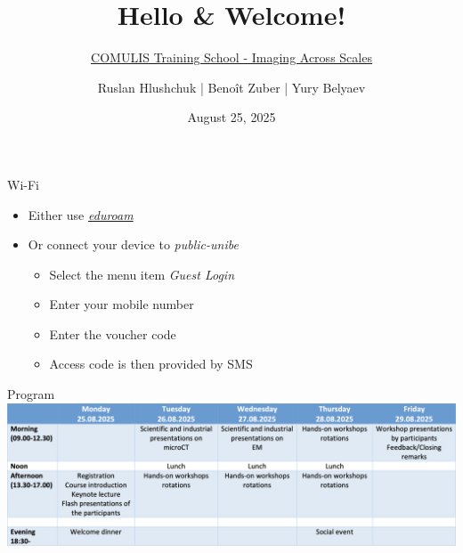 \documentclass[aspectratio=169,12pt]{beamer}
\title{Hello \& Welcome!}
\subtitle{\href{https://www.ana.unibe.ch/weiterbildung/comulis_training_school/}{COMULIS Training School - Imaging Across Scales}}
\author{Ruslan Hlushchuk | Benoît Zuber | Yury Belyaev}
\institute{Institute of Anatomy}
\date{August 25, 2025}
\begin{document}
\begin{frame}
	\titlepage
\end{frame}

\begin{frame}{Wi-Fi}
	\begin{itemize}
		\item Either use \emph{\href{https://www.eduroam.org/}{eduroam}}
		\item Or connect your device to \emph{public-unibe}
		\begin{itemize}
			\item Select the menu item \emph{Guest Login}
			\item Enter your mobile number
			\item Enter the voucher code \alert{}
			\item Access code is then provided by SMS
		\end{itemize}
	\end{itemize}
\end{frame}

\begin{frame}{Program}
	\includegraphics[width=\textwidth]{./images/program.png}
\end{frame}
\end{document}
